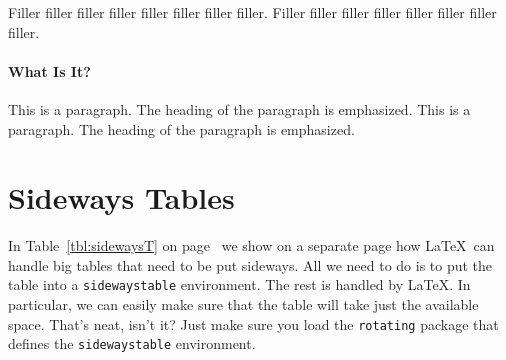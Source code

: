 Filler filler filler filler filler filler filler filler.
Filler filler filler filler filler filler filler filler.

\paragraph{What Is It?}
This is a paragraph.
The heading of the paragraph is emphasized.
This is a paragraph.
The heading of the paragraph is emphasized.

\section{Sideways Tables}

In Table~\ref{tbl:sidewaysT} on page~\pageref{tbl:sidewaysT} we show
on a separate page how \LaTeX\ can handle big tables that need to be
put sideways. All we need to do is to put the table into a
\texttt{sidewaystable} environment. The rest is handled by \LaTeX.
In particular, we can easily make sure that the table will take just
the available space. That's neat, isn't it? Just make sure you load
the \texttt{rotating} package that defines the
\texttt{sidewaystable} environment.

